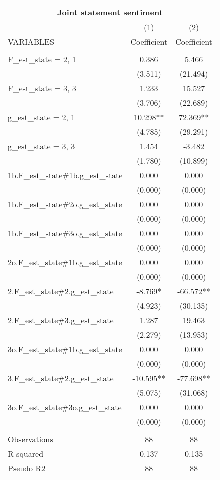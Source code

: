 \documentclass[]{article}
\begin{document}
\begin{tabular}{lcc}
\multicolumn{3}{c}{Joint statement sentiment} \\ \hline
 & (1) & (2) \\
VARIABLES & Coefficient & Coefficient \\ \hline
 &  &  \\
F\_est\_state = 2, 1 & 0.386 & 5.466 \\
 & (3.511) & (21.494) \\
F\_est\_state = 3, 3 & 1.233 & 15.527 \\
 & (3.706) & (22.689) \\
g\_est\_state = 2, 1 & 10.298** & 72.369** \\
 & (4.785) & (29.291) \\
g\_est\_state = 3, 3 & 1.454 & -3.482 \\
 & (1.780) & (10.899) \\
1b.F\_est\_state\#1b.g\_est\_state & 0.000 & 0.000 \\
 & (0.000) & (0.000) \\
1b.F\_est\_state\#2o.g\_est\_state & 0.000 & 0.000 \\
 & (0.000) & (0.000) \\
1b.F\_est\_state\#3o.g\_est\_state & 0.000 & 0.000 \\
 & (0.000) & (0.000) \\
2o.F\_est\_state\#1b.g\_est\_state & 0.000 & 0.000 \\
 & (0.000) & (0.000) \\
2.F\_est\_state\#2.g\_est\_state & -8.769* & -66.572** \\
 & (4.923) & (30.135) \\
2.F\_est\_state\#3.g\_est\_state & 1.287 & 19.463 \\
 & (2.279) & (13.953) \\
3o.F\_est\_state\#1b.g\_est\_state & 0.000 & 0.000 \\
 & (0.000) & (0.000) \\
3.F\_est\_state\#2.g\_est\_state & -10.595** & -77.698** \\
 & (5.075) & (31.068) \\
3o.F\_est\_state\#3o.g\_est\_state & 0.000 & 0.000 \\
 & (0.000) & (0.000) \\
 &  &  \\
Observations & 88 & 88 \\
R-squared & 0.137 & 0.135 \\
 Pseudo R2 & 88 & 88 \\ \hline
\end{tabular}
\end{document}
